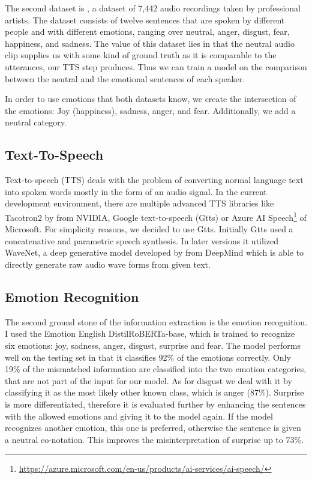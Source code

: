 \documentclass[11pt]{article}
\begin{document}
The second dataset is \cite{cao_data}, a dataset of 7,442 audio recordings taken by professional artists. The dataset consists of twelve sentences that are spoken by different people and with different emotions, ranging over neutral, anger, disgust, fear, happiness, and sadness. The value of this dataset lies in that the neutral audio clip supplies us with some kind of ground truth as it is comparable to the utterances, our TTS step produces. Thus we can train a model on the comparison between the neutral and the emotional sentences of each speaker.

In order to use emotions that both datasets know, we create the intersection of the emotions: Joy (happiness), sadness, anger, and fear. Additionally, we add a neutral category.
\subsection{Text-To-Speech}
Text-to-speech (TTS) deals with the problem of converting normal language text into spoken words mostly in the form of an audio signal. 
In the current development environment, there are multiple advanced TTS libraries like Tacotron2 by \cite{shen_natural_2018} from NVIDIA, Google text-to-speech (Gtts) \cite{gtts} or Azure AI Speech\footnote{\url{https://azure.microsoft.com/en-us/products/ai-services/ai-speech/}} of Microsoft. For simplicity reasons, we decided to use Gtts. Initially Gtts used a concatenative and parametric speech synthesis. In later versions it utilized WaveNet, a deep generative model developed by \citeauthor{van2016wavenet} from DeepMind which is able to directly generate raw audio wave forms from given text.

\subsection{Emotion Recognition}

The second ground stone of the information extraction is the emotion recognition. I used the Emotion English DistilRoBERTa-base\cite{hartmann2022emotionenglish}, which is trained to recognize six emotions: joy, sadness, anger, disgust, surprise and fear. The model performs well on the testing set in that it classifies 92\% of the emotions correctly. Only 19\% of the mismatched information are classified into the two emotion categories, that are not part of the input for our model. As for disgust we deal with it by classifying it as the most likely other known class, which is anger (87\%). Surprise is more differentiated, therefore it is evaluated further by enhancing the sentences with the allowed emotions and giving it to the model again. If the model recognizes another emotion, this one is preferred, otherwise the sentence is given a neutral co-notation. This improves the misinterpretation of surprise up to 73\%.
\end{document}
